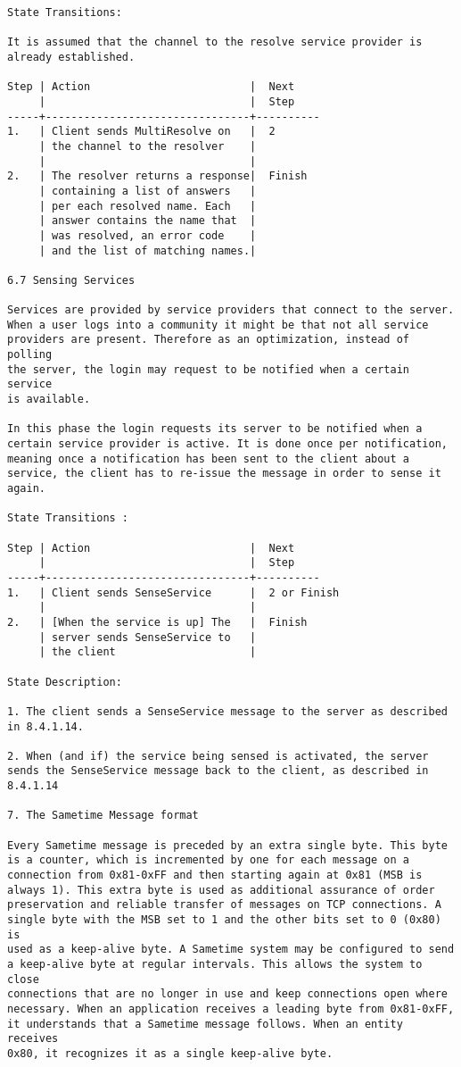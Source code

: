 \documentclass[titlepage,oneside]{book}
\begin{document}
\begin{verbatim}
State Transitions:

It is assumed that the channel to the resolve service provider is
already established.

Step | Action                         |  Next
     |                                |  Step
-----+--------------------------------+----------
1.   | Client sends MultiResolve on   |  2
     | the channel to the resolver    |
     |                                |
2.   | The resolver returns a response|  Finish
     | containing a list of answers   |
     | per each resolved name. Each   |
     | answer contains the name that  |
     | was resolved, an error code    |
     | and the list of matching names.|

6.7 Sensing Services

Services are provided by service providers that connect to the server.
When a user logs into a community it might be that not all service
providers are present. Therefore as an optimization, instead of polling
the server, the login may request to be notified when a certain service
is available.

In this phase the login requests its server to be notified when a
certain service provider is active. It is done once per notification,
meaning once a notification has been sent to the client about a
service, the client has to re-issue the message in order to sense it
again.

State Transitions :

Step | Action                         |  Next
     |                                |  Step
-----+--------------------------------+----------
1.   | Client sends SenseService      |  2 or Finish
     |                                |
2.   | [When the service is up] The   |  Finish
     | server sends SenseService to   |
     | the client                     |

State Description:

1. The client sends a SenseService message to the server as described
in 8.4.1.14.

2. When (and if) the service being sensed is activated, the server
sends the SenseService message back to the client, as described in
8.4.1.14

7. The Sametime Message format

Every Sametime message is preceded by an extra single byte. This byte
is a counter, which is incremented by one for each message on a
connection from 0x81-0xFF and then starting again at 0x81 (MSB is
always 1). This extra byte is used as additional assurance of order
preservation and reliable transfer of messages on TCP connections. A
single byte with the MSB set to 1 and the other bits set to 0 (0x80) is
used as a keep-alive byte. A Sametime system may be configured to send
a keep-alive byte at regular intervals. This allows the system to close
connections that are no longer in use and keep connections open where
necessary. When an application receives a leading byte from 0x81-0xFF,
it understands that a Sametime message follows. When an entity receives
0x80, it recognizes it as a single keep-alive byte.


\end{verbatim}
\end{document}
